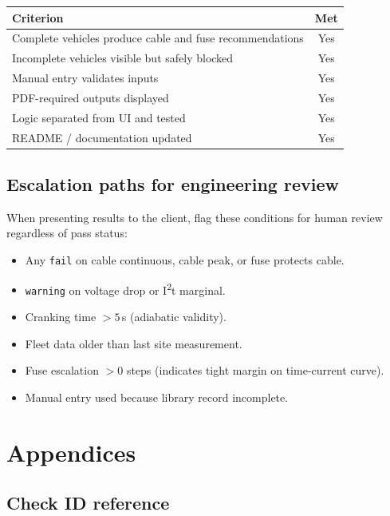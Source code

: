 \documentclass[11pt,a4paper]{report}
\begin{document}
\begin{table}[h]
  \centering
  \small
  \begin{tabular}{@{}p{7cm}c@{}}
    \toprule
    \textbf{Criterion} & \textbf{Met} \\
    \midrule
    Complete vehicles produce cable and fuse recommendations & Yes \\
    Incomplete vehicles visible but safely blocked & Yes \\
    Manual entry validates inputs & Yes \\
    PDF-required outputs displayed & Yes \\
    Logic separated from UI and tested & Yes \\
    README / documentation updated & Yes \\
    \bottomrule
  \end{tabular}
\end{table}

\section{Escalation paths for engineering review}

When presenting results to the client, flag these conditions for human review regardless of pass status:

\begin{itemize}
  \item Any \texttt{fail} on cable continuous, cable peak, or fuse protects cable.
  \item \texttt{warning} on voltage drop or I\textsuperscript{2}t marginal.
  \item Cranking time $> 5$\,s (adiabatic validity).
  \item Fleet data older than last site measurement.
  \item Fuse escalation $> 0$ steps (indicates tight margin on time-current curve).
  \item Manual entry used because library record incomplete.
\end{itemize}

\chapter{Appendices}

\section{Check ID reference}
\end{document}
